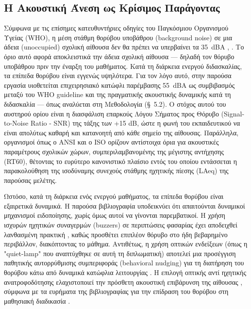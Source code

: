 \subsection{Η Ακουστική Άνεση ως Κρίσιμος Παράγοντας}

Σύμφωνα με τις επίσημες κατευθυντήριες οδηγίες του Παγκόσμιου Οργανισμού Υγείας (\textlatin{WHO}), η μέση στάθμη θορύβου υποβάθρου (\textlatin{background noise}) σε μια άδεια (\textlatin{unoccupied}) σχολική αίθουσα δεν θα πρέπει να υπερβαίνει τα 35~\textlatin{dBA} \cite{WHO1999}, \cite{Kephalopoulos2015}. Το όριο αυτό αφορά αποκλειστικά την άδεια σχολική αίθουσα --- δηλαδή τον θόρυβο υποβάθρου πριν την έναρξη του μαθήματος. Κατά τη διάρκεια ενεργού διδασκαλίας, τα επίπεδα θορύβου είναι εγγενώς υψηλότερα. Για τον λόγο αυτό, στην παρούσα εργασία υιοθετείται επιχειρησιακό κατώφλι παρέμβασης 55~\textlatin{dBA} ως συμβιβασμός μεταξύ του \textlatin{WHO guideline} και της πραγματικής ακουστικής δυναμικής κατά τη διδασκαλία --- όπως αναλύεται στη Μεθοδολογία (\S~5.2). Ο στόχος αυτού του αυστηρού ορίου είναι η διασφάλιση επαρκούς Λόγου Σήματος προς Θόρυβο (\textlatin{Signal-to-Noise Ratio - SNR}) της τάξης των +15 \textlatin{dB}, ώστε η φωνή του εκπαιδευτικού να είναι απολύτως καθαρή και κατανοητή από κάθε σημείο της αίθουσας. Παράλληλα, οργανισμοί όπως ο \textlatin{ANSI} \cite{ANSI2010} και ο \textlatin{ISO} \cite{ISO2008} ορίζουν αντίστοιχα όρια για ακουστικές παραμέτρους σχολικών χώρων, συμπεριλαμβανομένης της μέγιστης αντήχησης (\textlatin{RT60}), θέτοντας το ευρύτερο κανονιστικό πλαίσιο εντός του οποίου εντάσσεται η παρακολούθηση της ισοδύναμης συνεχούς στάθμης ηχητικής πίεσης (\textlatin{LAeq}) της παρούσας μελέτης.

Ωστόσο, κατά τη διάρκεια ενός ενεργού μαθήματος, τα επίπεδα θορύβου είναι εξαιρετικά δυναμικά. Η παρούσα βιβλιογραφία υποδεικνύει ότι απαιτούνται δυναμικοί μηχανισμοί ειδοποίησης, χωρίς όμως αυτοί να γίνονται παρεμβατικοί. Η χρήση ισχυρών ηχητικών συναγερμών (\textlatin{buzzers}) σε περιπτώσεις φασαρίας έχει αποδειχθεί λανθασμένη πρακτική \cite{MogasRecalde2021}, καθώς προσθέτει επιπλέον θόρυβο στο ήδη βεβαρημένο περιβάλλον, διακόπτοντας το μάθημα. Αντιθέτως, η χρήση οπτικών ενδείξεων (όπως η "\textlatin{quiet-lamp}" που αναπτύχθηκε σε αυτή τη διπλωματική) αποτελεί μια προσέγγιση παθητικής αυτορρύθμισης συμπεριφοράς (\textlatin{behavioral nudging}) για τη διατήρηση του θορύβου κάτω από δυναμικά κατώφλια λειτουργίας \cite{Dockrell2006}. Η επιλογή οπτικής αντί ηχητικής ανατροφοδότησης ελαχιστοποιεί την πρόσθετη ακουστική επιβάρυνση της αίθουσας \cite{Dockrell2006}, σύμφωνα με τα ευρήματα της βιβλιογραφίας για την επίδραση του θορύβου στη μαθησιακή διαδικασία \cite{MogasRecalde2021}.

